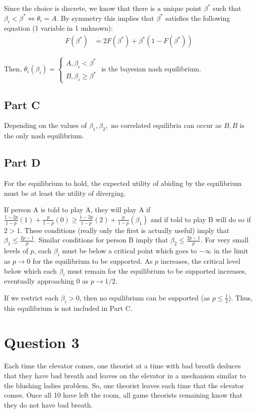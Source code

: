 \documentclass[11pt]{article} %
\begin{document}
Since the choice is discrete, we know that there is a unique point $\beta^{*}$ such that $\beta_i<\beta^{*}\iff\theta_i = A$. By symmetry this implies that $\beta^{*}$ satisfies the following equation (1 variable in 1 unknown):
\begin{align*}
F(\beta^{*})&=2F(\beta^{*}) + \beta^{*}(1-F(\beta^{*}))
\end{align*}

Then, $\theta_i(\beta_i) = \begin{cases} A, \beta_i<\beta^{*} \\ B, \beta_i\geq\beta^{*} \end{cases}$ is the bayesian nash equilibrium.
\subsection{Part C}
Depending on the values of $\beta_1,\beta_2,$ no correlated equilibria can occur as $B,B$ is the only nash equilibrium. %
\subsection{Part D}
For the equilibrium to hold, the expected utility of abiding by the equilibrium must be at least the utility of diverging.

If person  A is told to play A, they will play A if $\frac{1-2p}{1-p}(1) + \frac{p}{1-p}(0)\geq \frac{1-2p}{1-p}(2) + \frac{p}{1-p}(\beta_1)$ and if told to play B will do so if $2>1$. These conditions (really only the first is actually useful) imply that $\beta_1 \leq \frac{2p-1}{p}$. Similar conditions for person B imply that $\beta_2 \leq \frac{2p-1}{p}$. For very small levels of $p$, each $\beta_i$ must be below a critical point which goes to $-\infty$ in the limit as $p\rightarrow 0$ for the equilibrium to be supported. As $p$ increases, the critical level below which each $\beta_i$ must  remain for the equilibrium to be supported increases, eventually approaching $0$ as $p\rightarrow 1/2$.

If we restrict each $\beta_i>0$, then no equilibrium can be supported (as $p\leq\frac{1}{2}$). Thus, this equilibrium is not included in Part C.
\section{Question 3}
Each time the elevator comes, one theorist at a time with bad breath deduces that they have bad breath and leaves on the elevator in a mechanism similar to the blushing ladies problem. So, one theorist leaves each time that the elevator comes. Once all 10 have left the room, all game theorists remaining know that they do not have bad breath.
\end{document}
